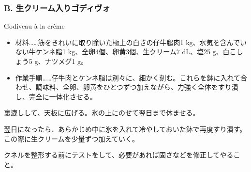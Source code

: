 \begin{recette}
\hypertarget{godiveau-a-la-creme}{%
\subsubsection{B. 生クリーム入りゴディヴォ}\label{godiveau-a-la-creme}}

\begin{frsubenv}

Godiveau à la crème

\end{frsubenv}


\begin{itemize}
\item
  材料\ldots{}\ldots{}筋をきれいに取り除いた極上の白さの仔牛腿肉1
  kg、水気を含んでいない牛ケンネ脂1 kg、全卵4個、卵黄3個、生クリーム7
  dL、塩25 g、白こしょう5 g、ナツメグ1 g。
\item
  作業手順\ldots{}\ldots{}仔牛肉とケンネ脂は別々に、細かく刻む。これらを鉢に入れて合わせ、調味料、全卵、卵黄をひとつずつ加えながら、力強く全体をすり潰し、完全に一体化させる。
\end{itemize}

裏漉しして、天板に広げる。氷の上にのせて翌日まで休ませる。

翌日になったら、あらかじめ中に氷を入れて冷やしておいた鉢で再度すり潰す。この際に生クリームを少量ずつ加えていく。

クネルを整形する前にテストをして、必要があれば固さなどを修正してやること。

\atoaki{}

\hypertarget{godiveau-lyonnais}{%
}
\end{recette}
